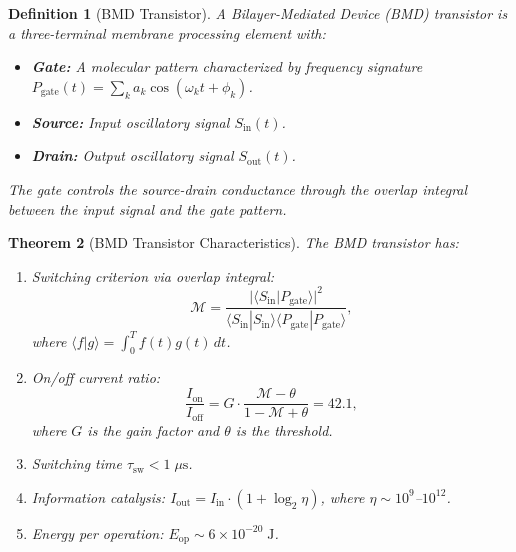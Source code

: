 \documentclass[twocolumn,10pt]{article}
\newtheorem{theorem}{Theorem}[section]
\newtheorem{definition}[theorem]{Definition}
\theoremstyle{remark}
\begin{document}
\begin{definition}[BMD Transistor]
\label{def:bmd}
A Bilayer-Mediated Device (BMD) transistor is a three-terminal membrane processing element with:
\begin{itemize}
\item \textbf{Gate:} A molecular pattern characterized by frequency signature $P_{\mathrm{gate}}(t) = \sum_k a_k \cos(\omega_k t + \phi_k)$.
\item \textbf{Source:} Input oscillatory signal $S_{\mathrm{in}}(t)$.
\item \textbf{Drain:} Output oscillatory signal $S_{\mathrm{out}}(t)$.
\end{itemize}
The gate controls the source-drain conductance through the overlap integral between the input signal and the gate pattern.
\end{definition}

\begin{theorem}[BMD Transistor Characteristics]
\label{thm:bmd}
The BMD transistor has:
\begin{enumerate}
\item Switching criterion via overlap integral:
\begin{equation}
\mathcal{M} = \frac{|\langle S_{\mathrm{in}} | P_{\mathrm{gate}} \rangle|^2}{\langle S_{\mathrm{in}} | S_{\mathrm{in}} \rangle \langle P_{\mathrm{gate}} | P_{\mathrm{gate}} \rangle},
\label{eq:overlap}
\end{equation}
where $\langle f | g \rangle = \int_0^T f(t) g(t)\, dt$.

\item On/off current ratio:
\begin{equation}
\frac{I_{\mathrm{on}}}{I_{\mathrm{off}}} = G \cdot \frac{\mathcal{M} - \theta}{1 - \mathcal{M} + \theta} = 42.1,
\label{eq:onoff}
\end{equation}
where $G$ is the gain factor and $\theta$ is the threshold.

\item Switching time $\tau_{\mathrm{sw}} < 1\;\mu\mathrm{s}$.

\item Information catalysis: $I_{\mathrm{out}} = I_{\mathrm{in}} \cdot (1 + \log_2 \eta)$, where $\eta \sim 10^9$--$10^{12}$.

\item Energy per operation: $E_{\mathrm{op}} \sim 6 \times 10^{-20}\;\mathrm{J}$.
\end{enumerate}
\end{theorem}
\end{document}
